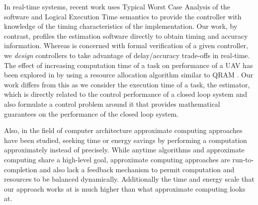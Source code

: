 In real-time systems, recent work \cite{FrehseHQW14_Formal} uses Typical Worst Case Analysis of the software and Logical Execution Time semantics to provide the controller with knowledge of the timing characteristics of the implementation.
Our work, by contrast, profiles the estimation software directly to obtain timing and accuracy information. Whereas \cite{FrehseHQW14_Formal} is concerned with formal verification of a given controller, we \emph{design} controllers to take advantage of delay/accuracy trade-offs in real-time. The effect of increasing computation time of a task on performance of a UAV has been explored in \cite{overbook} by using a resource allocation algorithm similar to QRAM \cite{qram}. Our work differs from this as we consider the execution time of a task, the estimator, which is directly related to the control performance of a closed loop system and also formulate a control problem around it that provides mathematical guarantees on the performance of the closed loop system.

Also, in the field of computer architecture approximate computing approaches \cite{loop-perf,rely,npu} have been studied, seeking time or energy
savings by performing a computation approximately instead of precisely. While
anytime algorithms and approximate computing share a high-level goal,
approximate computing approaches are run-to-completion and also lack a feedback
mechanism to permit computation and resources to be balanced dynamically. Additionally the time and energy scale that our approach works at is much higher than what approximate computing looks at.

